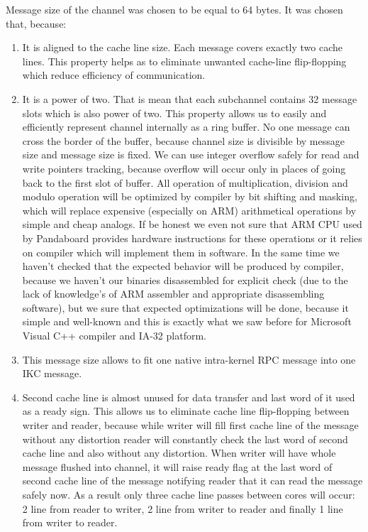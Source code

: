 \documentclass[a4paper,10pt]{article}
\begin{document}
	Message size of the channel was chosen to be equal to 64 bytes. It was chosen that, because:
	\begin{enumerate}
		\item It is aligned to the cache line size. 
		Each message covers exactly two cache lines. 
		This property helps as to eliminate unwanted cache-line flip-flopping which reduce efficiency of communication. 
		\item It is a power of two. 
		That is mean that each subchannel contains 32 message slots which is also power of two. 
		This property allows us to easily and efficiently represent channel internally as a ring buffer.
		No one message can cross the border of the buffer, because channel size is divisible by message size and message size is fixed.
		We can use integer overflow safely for read and write pointers tracking, because overflow will occur only in places of going back to the first slot of buffer.
		All operation of multiplication, division and modulo operation will be optimized by compiler by bit shifting and masking, which will replace expensive (especially on ARM) arithmetical operations by simple and cheap analogs.
		If be honest we even not sure that ARM CPU used by Pandaboard provides hardware instructions for these operations or it relies on compiler which will implement them in software.
		In the same time we haven't checked that the expected behavior will be produced by compiler, because we haven't our binaries disassembled for explicit check (due to the lack of knowledge's of ARM assembler and appropriate disassembling software), but we sure that expected optimizations will be done, because it simple and well-known and this is exactly what we saw before for Microsoft Visual C++ compiler and IA-32 platform. 
		\item This message size allows to fit one native intra-kernel RPC message into one IKC message.
		\item Second cache line is almost unused for data transfer and last word of it used as a ready sign.
		This allows us to eliminate cache line flip-flopping between writer and reader, because while writer will fill first cache line of the message without any distortion reader will constantly check the last word of second cache line and also without any distortion. 
		When writer will have whole message flushed into channel, it will raise ready flag at the last word of second cache line of the message notifying reader that it can read the message safely now.
		As a result only three cache line passes between cores will occur: 2 line from reader to writer, 2 line from writer to reader and finally 1 line from writer to reader.  
	\end{enumerate}
	
\end{document}
